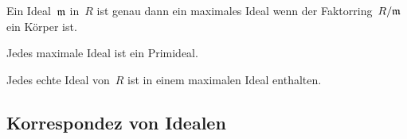 \begin{proposition}
  Ein Ideal~$\mathfrak{m}$ in~$R$ ist genau dann ein maximales Ideal wenn der Faktorring~$R/\mathfrak{m}$ ein Körper ist.
\end{proposition}

\begin{corollary}
  Jedes maximale Ideal ist ein Primideal.
\end{corollary}

\begin{proposition}
  Jedes echte Ideal von~$R$ ist in einem maximalen Ideal enthalten.
\end{proposition}



\subsection{Korrespondez von Idealen}

